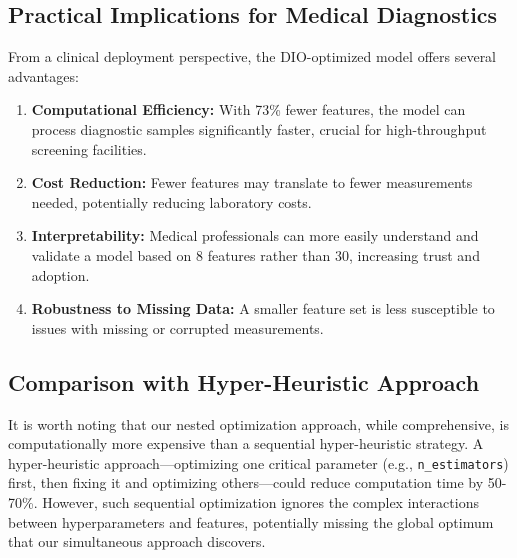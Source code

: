 \documentclass[12pt, a4paper]{article}
\begin{document}
\subsection{Practical Implications for Medical Diagnostics}
From a clinical deployment perspective, the DIO-optimized model offers several advantages:
\begin{enumerate}
    \item \textbf{Computational Efficiency:} With 73\% fewer features, the model can process diagnostic samples significantly faster, crucial for high-throughput screening facilities.
    \item \textbf{Cost Reduction:} Fewer features may translate to fewer measurements needed, potentially reducing laboratory costs.
    \item \textbf{Interpretability:} Medical professionals can more easily understand and validate a model based on 8 features rather than 30, increasing trust and adoption.
    \item \textbf{Robustness to Missing Data:} A smaller feature set is less susceptible to issues with missing or corrupted measurements.
\end{enumerate}

\subsection{Comparison with Hyper-Heuristic Approach}
It is worth noting that our nested optimization approach, while comprehensive, is computationally more expensive than a sequential hyper-heuristic strategy. A hyper-heuristic approach—optimizing one critical parameter (e.g., \texttt{n\_estimators}) first, then fixing it and optimizing others—could reduce computation time by 50-70\%. However, such sequential optimization ignores the complex interactions between hyperparameters and features, potentially missing the global optimum that our simultaneous approach discovers.
\end{document}
